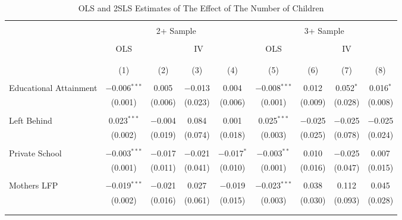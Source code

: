 

\begin{sidewaystable}[!htbp] \centering 
  \caption{OLS and 2SLS Estimates of The Effect of The Number of Children} 
  \label{tab:03} 
\begin{threeparttable}
\begin{tabular}{@{\extracolsep{5pt}}lcccccccc} 
\\[-1.8ex]\hline 
\hline \\[-1.8ex] 
 & \multicolumn{4}{c}{2+ Sample} & \multicolumn{4}{c}{3+ Sample} \\
\cline{2-5}  \cline{6-9} \\
 & OLS & \multicolumn{3}{c}{IV} & OLS & \multicolumn{3}{c}{IV} \\ 
\cline{3-5}  \cline{7-9} \\[-1.8ex]
\\[-1.8ex] & (1) & (2) & (3) & (4) & (5) & (6) & (7) & (8)\\ 
\hline \\[-1.8ex] 
 Educational Attainment & $-$0.006$^{***}$ & 0.005 & $-$0.013 & 0.004 & $-$0.008$^{***}$ & 0.012 & 0.052$^{*}$ & 0.016$^{*}$ \\ 
  & (0.001) & (0.006) & (0.023) & (0.006) & (0.001) & (0.009) & (0.028) & (0.008) \\ 
  & & & & & & & & \\ 
 Left Behind & 0.023$^{***}$ & $-$0.004 & 0.084 & 0.001 & 0.025$^{***}$ & $-$0.025 & $-$0.025 & $-$0.025 \\ 
  & (0.002) & (0.019) & (0.074) & (0.018) & (0.003) & (0.025) & (0.078) & (0.024) \\ 
  & & & & & & & & \\ 
 Private School & $-$0.003$^{***}$ & $-$0.017 & $-$0.021 & $-$0.017$^{*}$ & $-$0.003$^{**}$ & 0.010 & $-$0.025 & 0.007 \\ 
  & (0.001) & (0.011) & (0.041) & (0.010) & (0.001) & (0.016) & (0.047) & (0.015) \\ 
  & & & & & & & & \\ 
 Mothers LFP & $-$0.019$^{***}$ & $-$0.021 & 0.027 & $-$0.019 & $-$0.023$^{***}$ & 0.038 & 0.112 & 0.045 \\ 
  & (0.002) & (0.016) & (0.061) & (0.015) & (0.003) & (0.030) & (0.093) & (0.028) \\ 
  & & & & & & & & \\ 
\hline \\[-1.8ex] 

\end{tabular}
\end{threeparttable}
\end{sidewaystable}
